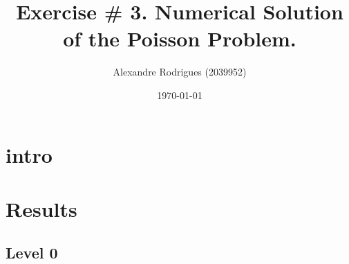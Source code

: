 \documentclass[a4paper, 11pt]{article}
\begin{document}
	
	\title{Exercise \# 3. Numerical Solution of the Poisson Problem. }
	\author{{\small Alexandre Rodrigues (2039952)}}
	\date{\today}
	
	\maketitle
		\section{intro}
		
		
		\section{Results}
		
			\subsection*{Level 0}
\end{document}
